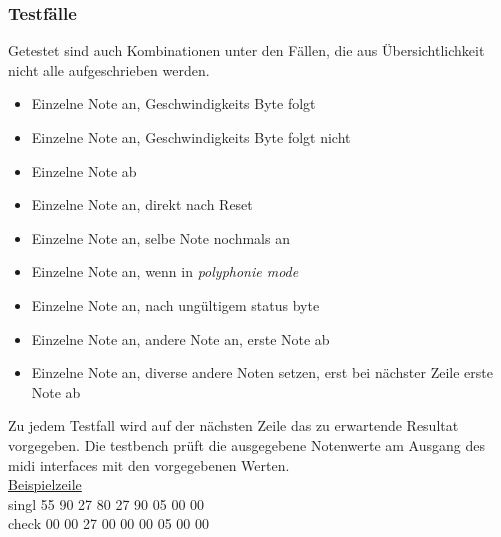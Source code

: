 \subsubsection{Testfälle}
Getestet sind auch Kombinationen unter den Fällen, die aus Übersichtlichkeit nicht alle aufgeschrieben werden.\\
\begin{itemize}
\item Einzelne Note an, Geschwindigkeits Byte folgt
\item Einzelne Note an, Geschwindigkeits Byte folgt nicht
\item Einzelne Note ab
\item Einzelne Note an, direkt nach Reset
\item Einzelne Note an, selbe Note nochmals an
\item Einzelne Note an, wenn in \textit{polyphonie mode}
\item Einzelne Note an, nach ungültigem status byte
\item Einzelne Note an, andere Note an, erste Note ab
\item Einzelne Note an, diverse andere Noten setzen, erst bei nächster Zeile erste Note ab
\end{itemize}

Zu jedem Testfall wird auf der nächsten Zeile das zu erwartende Resultat vorgegeben. Die testbench prüft die ausgegebene Notenwerte am Ausgang des midi interfaces mit den vorgegebenen Werten. \\


\underline{Beispielzeile}\\
singl \hspace*{3mm} 55 \hspace*{4mm} 90 \hspace*{12mm}  27 \hspace*{6mm} 80 \hspace*{10mm} 27 \hspace*{6mm} 90 \hspace*{10mm} 05 \hspace*{6mm} 00 \hspace*{12mm} 00\\
check \hspace*{2mm} 00 \hspace*{4mm} 00 \hspace*{12mm}  27 \hspace*{6mm} 00 \hspace*{10mm} 00 \hspace*{6mm} 00 \hspace*{10mm} 05 \hspace*{6mm} 00 \hspace*{12mm} 00\\


